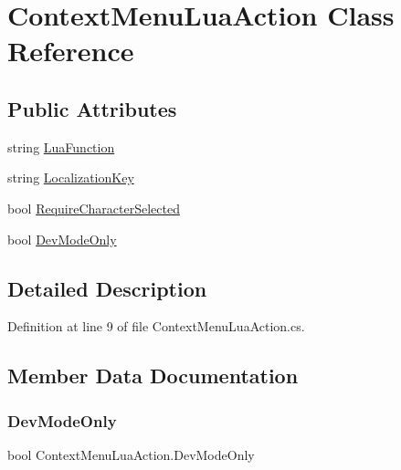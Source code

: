 \hypertarget{class_context_menu_lua_action}{}\section{Context\+Menu\+Lua\+Action Class Reference}
\label{class_context_menu_lua_action}
\subsection*{Public Attributes}
\begin{DoxyCompactItemize}
\item 
string \hyperlink{class_context_menu_lua_action_a52867e2eb4f5f226a0aa3b9f4dca271d}{Lua\+Function}
\item 
string \hyperlink{class_context_menu_lua_action_a38f4877889996ba9b9349703ac2b5813}{Localization\+Key}
\item 
bool \hyperlink{class_context_menu_lua_action_a3add6c1930c86eaf583ef3057e190460}{Require\+Character\+Selected}
\item 
bool \hyperlink{class_context_menu_lua_action_a97cc60ca954c1d4e3e30b8581b78f1f9}{Dev\+Mode\+Only}
\end{DoxyCompactItemize}


\subsection{Detailed Description}


Definition at line 9 of file Context\+Menu\+Lua\+Action.\+cs.



\subsection{Member Data Documentation}
\mbox{\label{class_context_menu_lua_action_a97cc60ca954c1d4e3e30b8581b78f1f9}} 
\subsubsection{\texorpdfstring{Dev\+Mode\+Only}{DevModeOnly}}
{\footnotesize\ttfamily bool Context\+Menu\+Lua\+Action.\+Dev\+Mode\+Only}



